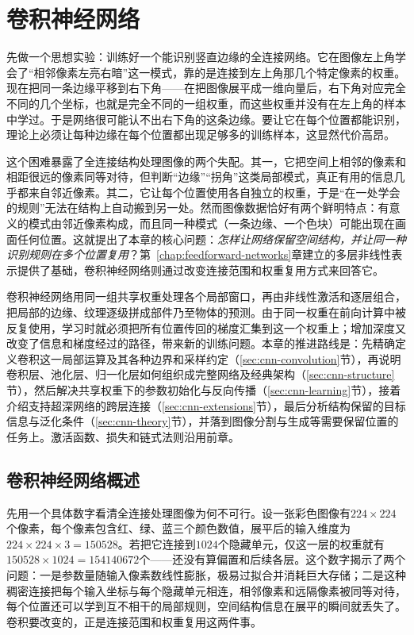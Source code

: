 \chapter{卷积神经网络}
\label{chap:convolutional-networks}

先做一个思想实验：训练好一个能识别竖直边缘的全连接网络。它在图像左上角学会了“相邻像素左亮右暗”这一模式，靠的是连接到左上角那几个特定像素的权重。现在把同一条边缘平移到右下角——在把图像展平成一维向量后，右下角对应完全不同的几个坐标，也就是完全不同的一组权重，而这些权重并没有在左上角的样本中学过。于是网络很可能认不出右下角的这条边缘。要让它在每个位置都能识别，理论上必须让每种边缘在每个位置都出现足够多的训练样本，这显然代价高昂。

这个困难暴露了全连接结构处理图像的两个失配。其一，它把空间上相邻的像素和相距很远的像素同等对待，但判断“边缘”“拐角”这类局部模式，真正有用的信息几乎都来自邻近像素。其二，它让每个位置使用各自独立的权重，于是“在一处学会的规则”无法在结构上自动搬到另一处。然而图像数据恰好有两个鲜明特点：有意义的模式由邻近像素构成，而且同一种模式（一条边缘、一个色块）可能出现在画面任何位置。这就提出了本章的核心问题：\emph{怎样让网络保留空间结构，并让同一种识别规则在多个位置复用}？第~\ref{chap:feedforward-networks}章建立的多层非线性表示提供了基础，卷积神经网络则通过改变连接范围和权重复用方式来回答它。

卷积神经网络用同一组共享权重处理各个局部窗口，再由非线性激活和逐层组合，把局部的边缘、纹理逐级拼成部件乃至物体的预测。由于同一权重在前向计算中被反复使用，学习时就必须把所有位置传回的梯度汇集到这一个权重上；增加深度又改变了信息和梯度经过的路径，带来新的训练问题。本章的推进路线是：先精确定义卷积这一局部运算及其各种边界和采样约定（\ref{sec:cnn-convolution}节），再说明卷积层、池化层、归一化层如何组织成完整网络及经典架构（\ref{sec:cnn-structure}节），然后解决共享权重下的参数初始化与反向传播（\ref{sec:cnn-learning}节），接着介绍支持超深网络的跨层连接（\ref{sec:cnn-extensions}节），最后分析结构保留的目标信息与泛化条件（\ref{sec:cnn-theory}节），并落到图像分割与生成等需要保留位置的任务上。激活函数、损失和链式法则沿用前章。

\section{卷积神经网络概述}
\label{sec:cnn-overview}

先用一个具体数字看清全连接处理图像为何不可行。设一张彩色图像有$224\times224$个像素，每个像素包含红、绿、蓝三个颜色数值，展平后的输入维度为$224\times224\times3=150528$。若把它连接到$1024$个隐藏单元，仅这一层的权重就有$150528\times1024=154140672$个——还没有算偏置和后续各层。这个数字揭示了两个问题：一是参数量随输入像素数线性膨胀，极易过拟合并消耗巨大存储；二是这种稠密连接把每个输入坐标与每个隐藏单元相连，相邻像素和远隔像素被同等对待，每个位置还可以学到互不相干的局部规则，空间结构信息在展平的瞬间就丢失了。卷积要改变的，正是连接范围和权重复用这两件事。

